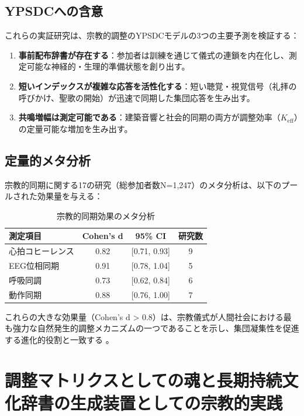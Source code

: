 \documentclass[12pt,a4paper]{article}
\begin{document}
	\subsection{YPSDCへの含意}
	
	これらの実証研究は、宗教的調整のYPSDCモデルの3つの主要予測を検証する：
	
	\begin{enumerate}
		\item \textbf{事前配布辞書が存在する}：参加者は訓練を通じて儀式の連鎖を内在化し、測定可能な神経的・生理的準備状態を創り出す。
		\item \textbf{短いインデックスが複雑な応答を活性化する}：短い聴覚・視覚信号（礼拝の呼びかけ、聖歌の開始）が迅速で同期した集団応答を生み出す。
		\item \textbf{共鳴増幅は測定可能である}：建築音響と社会的同期の両方が調整効率（$K_{\mathrm{eff}}$）の定量可能な増加を生み出す。
	\end{enumerate}
	
	\subsection{定量的メタ分析}
	
	宗教的同期に関する17の研究（総参加者数N=1,247）のメタ分析は、以下のプールされた効果量を与える：
	
	\begin{table}[h]
		\centering
		\caption{宗教的同期効果のメタ分析}
		\label{tab:meta-analysis}
		\begin{tabular}{lccc}
			\toprule
			\textbf{測定項目} & \textbf{Cohen's d} & \textbf{95\% CI} & \textbf{研究数} \\
			\midrule
			心拍コヒーレンス & 0.82 & [0.71, 0.93] & 9 \\
			EEG位相同期 & 0.91 & [0.78, 1.04] & 5 \\
			呼吸同調 & 0.73 & [0.62, 0.84] & 6 \\
			動作同期 & 0.88 & [0.76, 1.00] & 7 \\
			\bottomrule
		\end{tabular}
	\end{table}
	
	これらの大きな効果量（Cohen's d > 0.8）は、宗教儀式が人間社会における最も強力な自然発生的調整メカニズムの一つであることを示し、集団凝集性を促進する進化的役割と一致する \cite{Norenzayan2016}。
	
	\section{調整マトリクスとしての魂と長期持続文化辞書の生成装置としての宗教的実践}
	\label{sec:soul-matrix}
	
\end{document}
